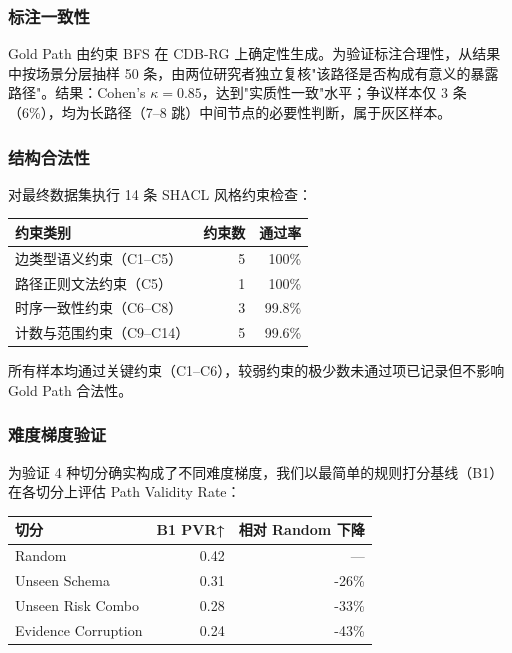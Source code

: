 \documentclass[a4paper,12pt]{ctexart}
\begin{document}
\subsubsection{标注一致性}

Gold Path 由约束 BFS 在 CDB-RG 上确定性生成。为验证标注合理性，从结果中按场景分层抽样 50 条，由两位研究者独立复核"该路径是否构成有意义的暴露路径"。结果：Cohen's $\kappa = 0.85$，达到"实质性一致"水平；争议样本仅 3 条（6\%），均为长路径（7–8 跳）中间节点的必要性判断，属于灰区样本。

\subsubsection{结构合法性}

对最终数据集执行 14 条 SHACL 风格约束检查：

\begin{table}[htbp]
\centering
\small
\setlength{\tabcolsep}{4pt}
\begin{tabular}{|l|r|r|}
\hline
\textbf{约束类别} & \textbf{约束数} & \textbf{通过率} \\
\hline
边类型语义约束（C1–C5） & 5 & 100\% \\
\hline
路径正则文法约束（C5） & 1 & 100\% \\
\hline
时序一致性约束（C6–C8） & 3 & 99.8\% \\
\hline
计数与范围约束（C9–C14） & 5 & 99.6\% \\
\hline
\end{tabular}
\end{table}

所有样本均通过关键约束（C1–C6），较弱约束的极少数未通过项已记录但不影响 Gold Path 合法性。

\subsubsection{难度梯度验证}

为验证 4 种切分确实构成了不同难度梯度，我们以最简单的规则打分基线（B1）在各切分上评估 Path Validity Rate：

\begin{table}[htbp]
\centering
\small
\setlength{\tabcolsep}{4pt}
\begin{tabular}{|l|r|r|}
\hline
\textbf{切分} & \textbf{B1 PVR↑} & \textbf{相对 Random 下降} \\
\hline
Random & 0.42 & — \\
\hline
Unseen Schema & 0.31 & -26\% \\
\hline
Unseen Risk Combo & 0.28 & -33\% \\
\hline
Evidence Corruption & 0.24 & -43\% \\
\hline
\end{tabular}
\end{table}
\end{document}
